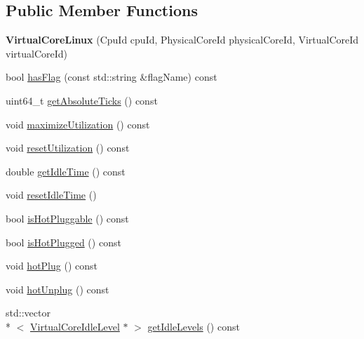 \subsection*{Public Member Functions}
\begin{DoxyCompactItemize}
\item 
\hypertarget{classmammut_1_1topology_1_1VirtualCoreLinux_a322e1ea00f2b3bb8a7b42483811d2d2e}{{\bfseries Virtual\-Core\-Linux} (Cpu\-Id cpu\-Id, Physical\-Core\-Id physical\-Core\-Id, Virtual\-Core\-Id virtual\-Core\-Id)}\label{classmammut_1_1topology_1_1VirtualCoreLinux_a322e1ea00f2b3bb8a7b42483811d2d2e}

\item 
bool \hyperlink{classmammut_1_1topology_1_1VirtualCoreLinux_ac05cd4f3131857160bb438b0abfacfd6}{has\-Flag} (const std\-::string \&flag\-Name) const 
\item 
uint64\-\_\-t \hyperlink{classmammut_1_1topology_1_1VirtualCoreLinux_acf8e7e73687907450f243d5c8014a6cb}{get\-Absolute\-Ticks} () const 
\item 
void \hyperlink{classmammut_1_1topology_1_1VirtualCoreLinux_a9e06cca87b5879be4fe433bd409098e4}{maximize\-Utilization} () const 
\item 
void \hyperlink{classmammut_1_1topology_1_1VirtualCoreLinux_a9091e0404bacb86772ee34c3c24e5713}{reset\-Utilization} () const 
\item 
double \hyperlink{classmammut_1_1topology_1_1VirtualCoreLinux_a8e637a85c90167e45f6a051ac1b689d9}{get\-Idle\-Time} () const 
\item 
void \hyperlink{classmammut_1_1topology_1_1VirtualCoreLinux_aaa38f4ffc17855b1cd97c4c7b2002eb6}{reset\-Idle\-Time} ()
\item 
bool \hyperlink{classmammut_1_1topology_1_1VirtualCoreLinux_a055bb4d39491bc01f36e2c3eb9f76ca8}{is\-Hot\-Pluggable} () const 
\item 
bool \hyperlink{classmammut_1_1topology_1_1VirtualCoreLinux_a9967ee4dc065b3478b7456439432c853}{is\-Hot\-Plugged} () const 
\item 
void \hyperlink{classmammut_1_1topology_1_1VirtualCoreLinux_acbe52ae75f315f953d7945719a044d80}{hot\-Plug} () const 
\item 
void \hyperlink{classmammut_1_1topology_1_1VirtualCoreLinux_a8021dd7fbaeb546770d3752ede651e78}{hot\-Unplug} () const 
\item 
std\-::vector\\*
$<$ \hyperlink{classmammut_1_1topology_1_1VirtualCoreIdleLevel}{Virtual\-Core\-Idle\-Level} $\ast$ $>$ \hyperlink{classmammut_1_1topology_1_1VirtualCoreLinux_a615953356164817ea8d416f439ac0f72}{get\-Idle\-Levels} () const 
\end{DoxyCompactItemize}

